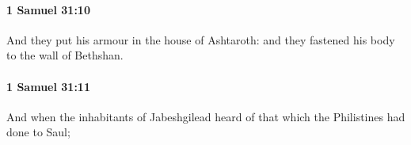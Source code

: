 		\paragraph{1 Samuel 31:10} %
			\label{1SAMUEL-31-10}

			And they put his armour in the house of Ashtaroth: and they fastened his body to the wall of Bethshan.


		\paragraph{1 Samuel 31:11} %
			\label{1SAMUEL-31-11}

			And when the inhabitants of Jabeshgilead heard of that which the Philistines had done to Saul;


